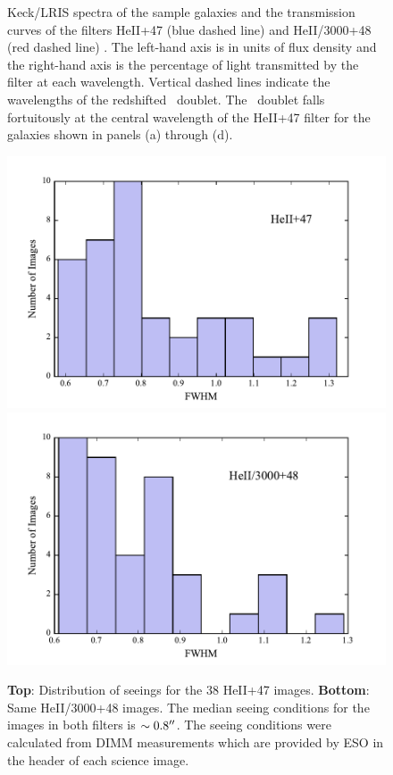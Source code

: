 \documentclass[twocolumn]{aastex61}
\begin{document}
\begin{figure}[!h]
\centering
{}
\caption{Keck/LRIS spectra of the sample galaxies and the transmission curves of the filters HeII+47 (blue dashed line) and HeII/3000+48 (red dashed line) . The left-hand axis is in units of flux density and the right-hand axis is the percentage of light transmitted by the filter at each wavelength. Vertical dashed lines indicate the wavelengths of the redshifted \ doublet. The \ doublet falls fortuitously at the central wavelength of the HeII+47 filter for the galaxies shown in panels (a) through (d).}
\label{fig:spec_images}
\end{figure}

\begin{figure}[h]
\centering
\includegraphics[scale=.55]{../Figures/avg_seeing_HEII.pdf}
\includegraphics[scale=.55]{../Figures/avg_seeing_HEII3000.pdf}
\caption{\textbf{Top}: Distribution of seeings for the 38 HeII+47 images.
\textbf{Bottom}: Same HeII/3000+48 images. The median seeing conditions for the images in both filters is $\sim 0.8\mbox{$^{\prime\prime}$}$. 
The seeing conditions were calculated from DIMM measurements which are provided by ESO in the header of each science image.
\label{fig.seeing}}
\end{figure}
\end{document}
